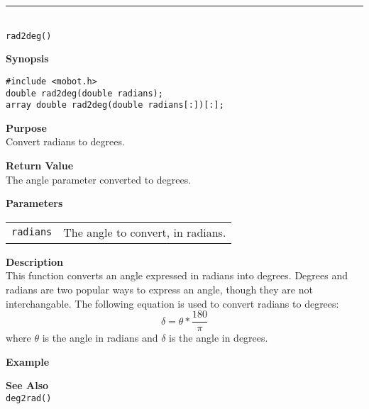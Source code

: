 \noindent
\vspace{5pt}
\rule{4.5in}{0.015in}\\
\noindent
{\LARGE \texttt{rad2deg()}}\\
{}

\noindent
{\bf Synopsis}
\vspace{-8pt}
\begin{verbatim}
#include <mobot.h>
double rad2deg(double radians);
array double rad2deg(double radians[:])[:];
\end{verbatim}

\noindent
{\bf Purpose}\\
Convert radians to degrees.

\noindent
{\bf Return Value}\\
The angle parameter converted to degrees.

\noindent
{\bf Parameters}
\vspace{-0.1in}
\begin{description}
\item               
\begin{tabular}{p{10 mm}p{145 mm}}
\texttt{radians} & The angle to convert, in radians. \\
\end{tabular}
\end{description}

\noindent
{\bf Description}\\
This function converts an angle expressed in radians into degrees. Degrees and
radians are two popular ways to express an angle, though they are not interchangable.
The following equation is used to convert radians to degrees:
\begin{equation*}
\delta = \theta * \frac{180}{\pi}
\end{equation*}
where $\theta$ is the angle in radians and $\delta$ is the angle in degrees.

\noindent
{\bf Example}\\
\noindent

\noindent
{\bf See Also}\\
\texttt{deg2rad()}

